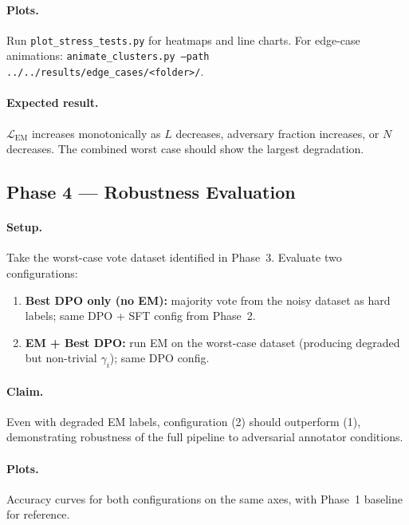 \documentclass[11pt, a4paper]{article}
\begin{document}
\paragraph{Plots.}
Run \texttt{plot\_stress\_tests.py} for heatmaps and line charts. For edge-case
animations: \texttt{animate\_clusters.py --path ../../results/edge\_cases/<folder>/}.

\paragraph{Expected result.}
$\mathcal{L}_\text{EM}$ increases monotonically as $L$ decreases, adversary fraction
increases, or $N$ decreases. The combined worst case should show the largest degradation.

\subsection{Phase 4 --- Robustness Evaluation}

\paragraph{Setup.}
Take the worst-case vote dataset identified in Phase~3. Evaluate two configurations:
\begin{enumerate}[noitemsep]
  \item \textbf{Best DPO only (no EM):} majority vote from the noisy dataset as hard
        labels; same DPO + SFT config from Phase~2.
  \item \textbf{EM + Best DPO:} run EM on the worst-case dataset (producing degraded
        but non-trivial $\gamma_i$); same DPO config.
\end{enumerate}

\paragraph{Claim.}
Even with degraded EM labels, configuration (2) should outperform (1), demonstrating
robustness of the full pipeline to adversarial annotator conditions.

\paragraph{Plots.}
Accuracy curves for both configurations on the same axes, with Phase~1 baseline for reference.

\end{document}

